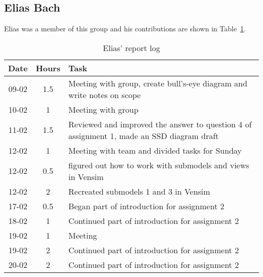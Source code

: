 \subsection{Elias Bach}
Elias was a member of this group and his contributions are shown in Table~\ref{tab:elias_log}. 
\begin{longtable}[c]{c|c|m{35em}}
\caption{Elias' report log}
\label{tab:elias_log}\\
\textbf{Date}& \textbf{Hours} & \textbf{Task} \\
\hline
\endfirsthead
%
\endhead
%
09-02 & 1.5 & Meeting with group, create bull's-eye diagram and write notes on scope\\
10-02 & 1 & Meeting with group \\
11-02 & 1.5 & Reviewed and improved the answer to question 4 of assignment 1, made an SSD diagram draft \\
12-02 & 1 & Meeting with team and divided tasks for Sunday\\ 
12-02 & 0.5 & figured out how to work with submodels and views in Vensim \\
12-02 & 2 & Recreated submodels 1 and 3 in Vensim \\
17-02 & 0.5 & Began part of introduction for assignment 2 \\
18-02 & 1 & Continued part of introduction for assignment 2 \\
19-02 & 1 & Meeting \\
19-02 & 2 & Continued part of introduction for assignment 2 \\
20-02 & 2 & Continued part of introduction for assignment 2 \\

\end{longtable}

